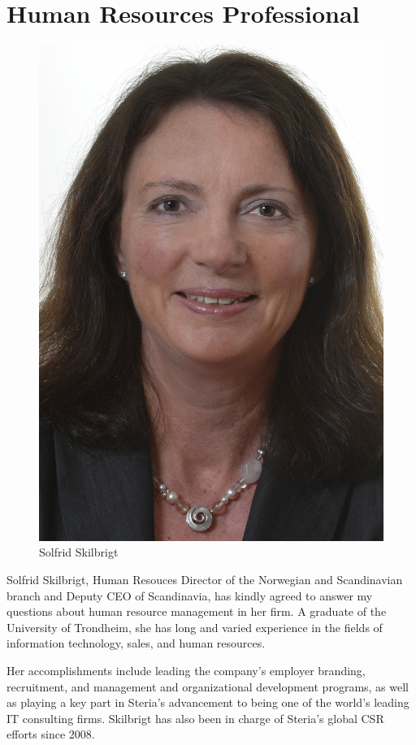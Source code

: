 \documentclass[letterpaper, 10pt]{report}
\begin{document}
\section{Human Resources Professional}
\begin{figure}
	\centering
	\includegraphics[width=\textwidth]{solfrid}
	\caption*{Solfrid Skilbrigt}
\end{figure}
Solfrid Skilbrigt, Human Resouces Director of the Norwegian and Scandinavian branch and Deputy CEO of Scandinavia, has kindly agreed to answer my questions about human resource management in her firm. 
A graduate of the University of Trondheim, she has long and varied experience in the fields of information technology, sales, and human resources.

Her accomplishments include leading the company's employer branding, recruitment, and management and organizational development programs, as well as playing a key part in Steria's advancement to being one of the world's leading IT consulting firms. 
Skilbrigt has also been in charge of Steria's global CSR efforts since 2008.
\end{document}
